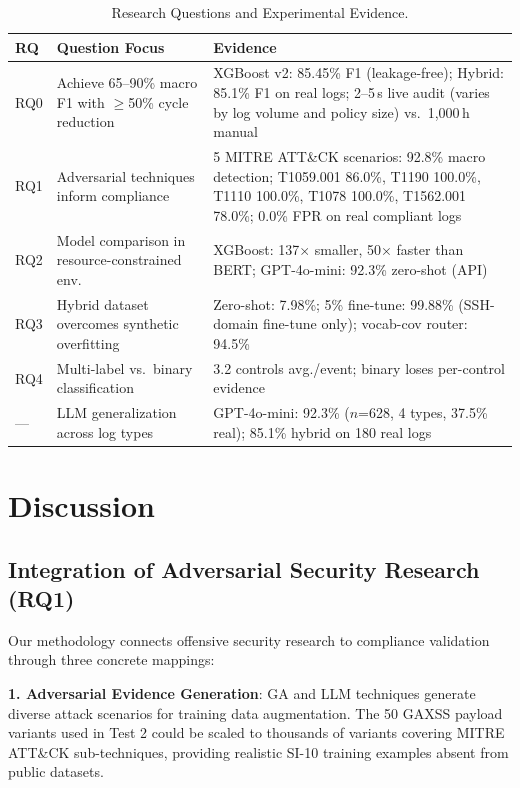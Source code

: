 \documentclass[futureinternet,article,submit,pdftex,moreauthors]{Definitions/mdpi}
\begin{document}
\begin{table}[H]
\caption{Research Questions and Experimental Evidence.\label{tab:rq_summary}}
\begin{tabularx}{\textwidth}{lXX}
\toprule
\textbf{RQ} & \textbf{Question Focus} & \textbf{Evidence} \\
\midrule
RQ0 & Achieve 65--90\% macro F1 with $\geq$50\% cycle reduction & XGBoost v2: 85.45\% F1 (leakage-free);
Hybrid: 85.1\% F1 on real logs; 2--5\,s live audit (varies by log volume and policy size) vs.\ 1{,}000\,h manual \\
RQ1 & Adversarial techniques inform compliance & 5 MITRE ATT\&CK scenarios: 92.8\%
macro detection; T1059.001 86.0\%, T1190 100.0\%, T1110 100.0\%, T1078 100.0\%,
T1562.001 78.0\%; 0.0\% FPR on real compliant logs \\
RQ2 & Model comparison in resource-constrained env. & XGBoost: 137$\times$ smaller, 50$\times$
faster than BERT; GPT-4o-mini: 92.3\% zero-shot (API) \\
RQ3 & Hybrid dataset overcomes synthetic overfitting & Zero-shot: 7.98\%; 5\% fine-tune:
99.88\% (SSH-domain fine-tune only); vocab-cov router: 94.5\% \\
RQ4 & Multi-label vs.\ binary classification & 3.2 controls avg./event; binary loses
per-control evidence \\
--- & LLM generalization across log types & GPT-4o-mini: 92.3\% ($n$=628, 4 types, 37.5\% real); 85.1\% hybrid on 180 real logs \\
\bottomrule
\end{tabularx}
\end{table}

\section{Discussion}
\label{sec:discussion}

\subsection{Integration of Adversarial Security Research (RQ1)}

Our methodology connects offensive security research to compliance validation through three
concrete mappings:

\textbf{1. Adversarial Evidence Generation}: GA and LLM techniques generate diverse attack
scenarios for training data augmentation. The 50 GAXSS payload variants used in Test 2 could
be scaled to thousands of variants covering MITRE ATT\&CK sub-techniques, providing realistic
SI-10 training examples absent from public datasets.
\end{document}
